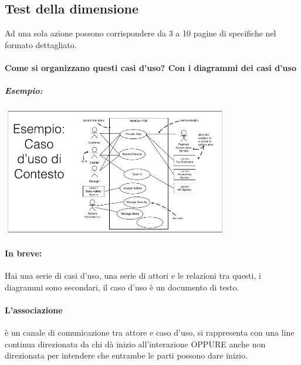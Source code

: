 \documentclass[12pt, a4paper, openany, twoside]{book}
\begin{document}
\subsection{Test della dimensione}
Ad una sola azione possono corrispondere da 3 a 10 pagine di specifiche nel formato
dettagliato.
\paragraph{Come si organizzano questi casi d'uso? Con i diagrammi dei casi d'uso}
\subparagraph{Esempio:}	
\begin{center}
\includegraphics[width=0.75\textwidth]{3}
\end{center}
\paragraph{In breve:} Hai una serie di casi d'uso, una serie di attori e le
relazioni tra questi, i diagrammi sono secondari, il caso d'uso è un documento
di testo.
\paragraph{L'associazione} è un canale di comunicazione tra attore e caso d'uso,
si rappresenta con una line continua direzionata da chi dà inizio all'interazione
OPPURE anche non direzionata per intendere che entrambe le parti possono dare inizio.
\end{document}
